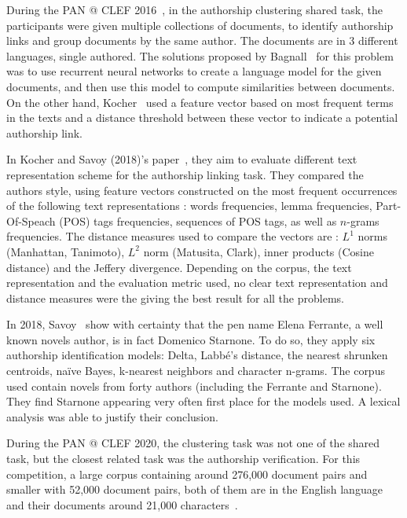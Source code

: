 During the PAN @ CLEF 2016~\cite{pan16}, in the authorship clustering shared task, the participants were given multiple collections of documents, to identify authorship links and group documents by the same author.
The documents are in 3 different languages, single authored.
The solutions proposed by Bagnall~\cite{bagnall_pan16} for this problem was to use recurrent neural networks to create a language model for the given documents, and then use this model to compute similarities between documents.
On the other hand, Kocher~\cite{kocher_pan16} used a feature vector based on most frequent terms in the texts and a distance threshold between these vector to indicate a potential authorship link.

In Kocher and Savoy (2018)'s paper~\cite{kocher_linking}, they aim to evaluate different text representation scheme for the authorship linking task.
They compared the authors style, using feature vectors constructed on the most frequent occurrences of the following text representations : words frequencies, lemma frequencies, Part-Of-Speach (POS) tags frequencies, sequences of POS tags, as well as $n$-grams frequencies.
The distance measures used to compare the vectors are : $L^1$ norms (Manhattan, Tanimoto), $L^2$ norm (Matusita, Clark), inner products (Cosine distance) and the Jeffery divergence.
Depending on the corpus, the text representation and the evaluation metric used, no clear text representation and distance measures were the giving the best result for all the problems.

In 2018, Savoy~\cite{savoy_starnone} show with certainty that the pen name Elena Ferrante, a well known novels author, is in fact Domenico Starnone.
To do so, they apply six authorship identification models: Delta, Labbé's distance, the nearest shrunken centroids, naïve Bayes, k-nearest neighbors and character n-grams.
The corpus used contain novels from forty authors (including the Ferrante and Starnone).
They find Starnone appearing very often first place for the models used.
A lexical analysis was able to justify their conclusion.

During the PAN @ CLEF 2020, the clustering task was not one of the shared task, but the closest related task was the authorship verification.
For this competition, a large corpus containing around 276,000 document pairs and smaller with 52,000 document pairs, both of them are in the English language and their documents around 21,000 characters~\cite{overview_pan20}.

